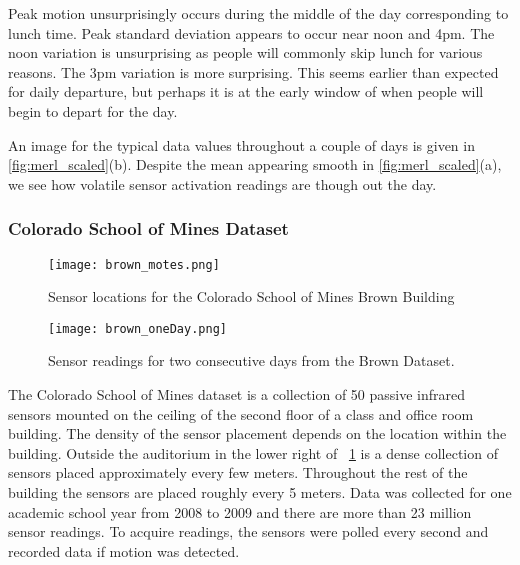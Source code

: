 Peak motion unsurprisingly occurs during the middle of the day corresponding to lunch time.  Peak standard deviation appears to occur near noon and 4pm.  The noon variation is unsurprising as people will commonly skip lunch for various reasons.  The 3pm variation is more surprising.  This seems earlier than expected for daily departure, but perhaps it is at the early window of when people will begin to depart for the day.  

An image for the typical data values throughout a couple of days is given in \ref{fig:merl_scaled}(b).  Despite the mean appearing smooth in \ref{fig:merl_scaled}(a), we see how volatile sensor activation readings are though out the day.


\subsubsection{Colorado School of Mines Dataset}

\begin{figure}[t!]
	\begin{center}
		\texttt{[image: brown\_motes.png]}
	\end{center}
	\caption{Sensor locations for the Colorado School of Mines Brown Building}
	\label{fig:csmbbfloor}
\end{figure}

\begin{figure}[!h]
	\begin{center}
		\texttt{[image: brown\_oneDay.png]}
	\end{center}
	\caption{Sensor readings for two consecutive days from the Brown Dataset.}
	\label{fig:csmbbsensor}
\end{figure}

The Colorado School of Mines dataset \cite{Hoff2009, Howard2013} is a collection of 50 passive infrared sensors mounted on the ceiling of the second floor of a class and office room building.  The density of the sensor placement depends on the location within the building.  Outside the auditorium in the lower right of ~\ref{fig:csmbbfloor} is a dense collection of sensors placed approximately every few meters.  Throughout the rest of the building the sensors are placed roughly every 5 meters.  Data was collected for one academic school year from 2008 to 2009 and there are more than 23 million sensor readings.  To acquire readings, the sensors were polled every second and recorded data if motion was detected.  

